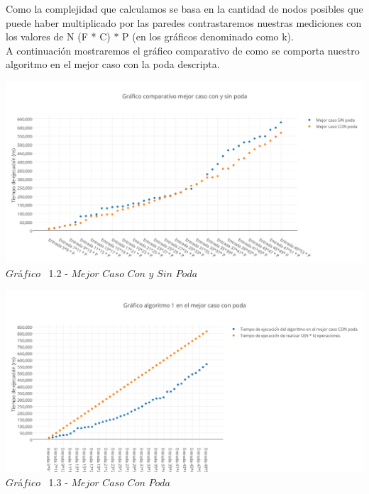 Como la complejidad que calculamos se basa en la cantidad de nodos posibles que puede haber multiplicado por las paredes contrastaremos nuestras mediciones con los valores de N (F * C) $\ast$ P (en los gr\'aficos denominado como k).\\
A continuaci\'on mostraremos el gr\'afico comparativo de como se comporta nuestro algoritmo en el mejor caso con la poda descripta.\\

\vspace*{0.3cm} \vspace*{0.3cm}
  \begin{center}
 \includegraphics[scale=0.65]{./EJ1/mejorcaso1.png}
 {$Gr$\'a$fico$ \ 1.2 - $Mejor$ $Caso$ $Con$ $y$ $Sin$ $Poda$}
  \end{center}
  \vspace*{0.3cm}

\vspace*{0.3cm} \vspace*{0.3cm}
  \begin{center}
 \includegraphics[scale=0.65]{./EJ1/mejorcaso11.png}
 {$Gr$\'a$fico$ \ 1.3 - $Mejor$ $Caso$ $Con$ $Poda$}
  \end{center}
  \vspace*{0.3cm}

